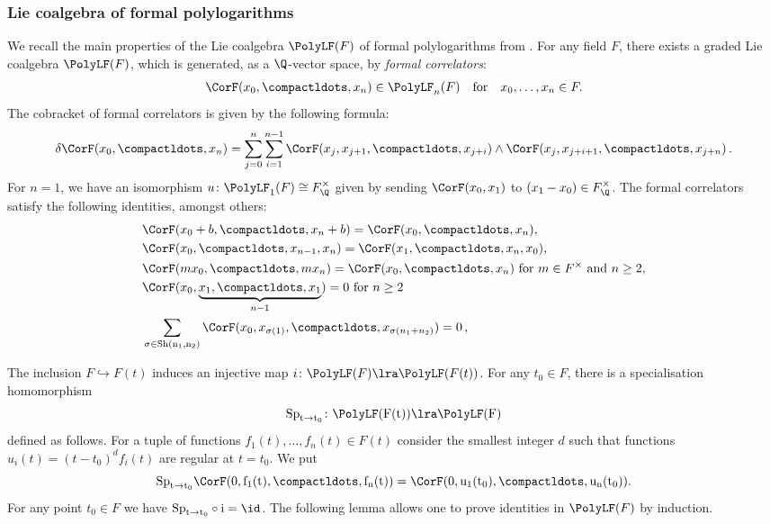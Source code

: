 \documentclass[a4paper]{amsart}
\begin{document}
\subsubsection{Lie coalgebra of formal polylogarithms}\label{sec:formal-polylogarithms}
We recall the main properties of the Lie coalgebra $\PolyLF(F)$ of formal polylogarithms from \cite[\S2]{CMRR24}. For any field $F$, there exists a graded Lie coalgebra $\PolyLF(F)$, which is generated, as a $\Q$-vector space, by \emph{formal correlators}:
\[
\CorF(x_0,\compactldots,x_n)\in \PolyLF_n(F)\quad  \text{for}\quad x_0,\dots,x_n\in F.
\]
The cobracket of formal correlators is given by the following formula:
\begin{equation} \label{eqn:form-cor-cobracket}
\delta\CorF (x_0,\compactldots, x_n )=\sum_{j=0}^n\sum_{i=1}^{n-1}\CorF( x_{j}, x_{j+1}, \compactldots, x_{j+i}) \wedge \CorF( x_{j},  x_{j+i+1}, \compactldots, x_{j+n})\,.
\end{equation}
For $n=1$, we have an isomorphism $u\colon \PolyLF_1(F)\cong F^{\times}_{\Q}$ given by sending $\CorF(x_0,x_1)$ to $(x_1-x_0)\in F^{\times}_{\Q}$. The formal correlators satisfy the following identities, amongst others:
\begin{align}
&\CorF(x_0+b,\compactldots,x_n+b)=\CorF(x_0,\compactldots,x_n),\label{eqn:form-cor-add}\\
&\CorF(x_0,\compactldots,x_{n-1},x_n)=\CorF(x_1,\compactldots,x_n,x_0), \label{eqn:form-cor-cyc-sym}\\
&\CorF(m x_0,\compactldots,m x_n)=\CorF(x_0,\compactldots,x_n) \text{ for } m\in F^{\times} \text{ and } n\geq 2, \label{eqn:form-cor-homog}\\
& \CorF(x_0,\underbrace{x_1, \compactldots, x_1}_{n-1})=0 \text{ for } n\geq 2\label{eqn:form-cor-norm}\\
&\sum_{\sigma \in \rm{Sh}(n_1,n_2)} \CorF(x_0,x_{\sigma(1)},\compactldots,x_{\sigma(n_1+n_2)})=0\,,
\end{align}

The inclusion $F\hookrightarrow F(t)$ induces an injective map $i\colon \PolyLF(F)\lra \PolyLF(F(t))$. For any $t_0 \in F$, there is a specialisation homomorphism
\[
\rm{Sp}_{t\to t_0} \colon \PolyLF(F(t))\lra  \PolyLF(F) 
\]
defined as follows. For a tuple of functions $f_1(t),\dots,f_n(t)\in F(t)$ consider the smallest integer $d$ such that functions $u_i(t)=(t-t_0)^d f_i(t)$ are regular at $t=t_0$. We put 
\[
\rm{Sp}_{t\to t_0}\CorF(0,f_1(t),\compactldots,f_n(t))=\CorF(0, u_1(t_0),\compactldots,u_n(t_0)).
\]
For any point $t_0\in F$ we have $\rm{Sp}_{t\to t_0}\circ i=\id$. The following lemma allows one to prove identities in $\PolyLF(F)$ by induction. 
\end{document}
